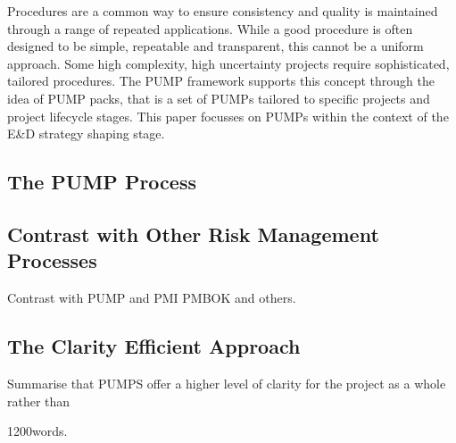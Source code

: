 Procedures are a common way to ensure consistency and quality is maintained through a range of repeated applications.
While a good procedure is often designed to be simple, repeatable and transparent, this cannot be a uniform approach.
Some high complexity, high uncertainty projects require sophisticated, tailored procedures.
The PUMP framework supports this concept through the idea of PUMP packs, that is a set of PUMPs tailored to specific projects and project lifecycle stages.
This paper focusses on PUMPs within the context of the E\&D strategy shaping stage.


\subsection{The PUMP Process}



\subsection{Contrast with Other Risk Management Processes}
Contrast with PUMP and PMI PMBOK and others.

\subsection{The Clarity Efficient Approach}
Summarise that PUMPS offer a higher level of clarity for the project as a whole rather than 


1200words.